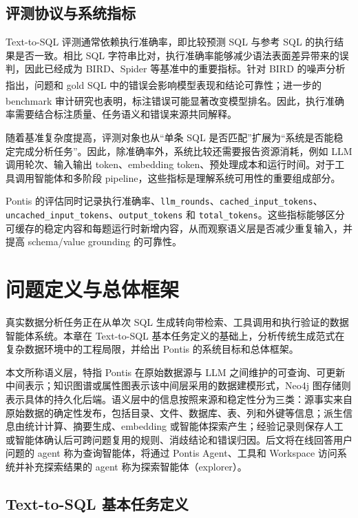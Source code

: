 \documentclass[
    bachelor,
    pdflinks,
]{xjtuthesis}
\newcommand{\upcite}[1]{\textsuperscript{\cite{#1}}}
\begin{document}
\section{评测协议与系统指标}

Text-to-SQL 评测通常依赖执行准确率，即比较预测 SQL 与参考 SQL 的执行结果是否一致。相比 SQL 字符串比对，执行准确率能够减少语法表面差异带来的误判，因此已经成为 BIRD、Spider 等基准中的重要指标。针对 BIRD 的噪声分析指出，问题和 gold SQL 中的错误会影响模型表现和结论可靠性\upcite{wretblad2024birdNoise}；进一步的 benchmark 审计研究也表明，标注错误可能显著改变模型排名\upcite{jin2026annotationErrors}。因此，执行准确率需要结合标注质量、任务语义和错误来源共同解释。

随着基准复杂度提高，评测对象也从“单条 SQL 是否匹配”扩展为“系统是否能稳定完成分析任务”。因此，除准确率外，系统比较还需要报告资源消耗，例如 LLM 调用轮次、输入输出 token、embedding token、预处理成本和运行时间。对于工具调用智能体和多阶段 pipeline，这些指标是理解系统可用性的重要组成部分。

Pontis 的评估同时记录执行准确率、\texttt{llm\_rounds}、\texttt{cached\_input\_tokens}、\texttt{uncached\_input\_tokens}、\texttt{output\_tokens} 和 \texttt{total\_tokens}。这些指标能够区分可缓存的稳定内容和每题运行时新增内容，从而观察语义层是否减少重复输入，并提高 schema/value grounding 的可靠性。


\chapter{问题定义与总体框架}

真实数据分析任务正在从单次 SQL 生成转向带检索、工具调用和执行验证的数据智能体系统。本章在 Text-to-SQL 基本任务定义的基础上，分析传统生成范式在复杂数据环境中的工程局限，并给出 Pontis 的系统目标和总体框架。

本文所称语义层，特指 Pontis 在原始数据源与 LLM 之间维护的可查询、可更新中间表示；知识图谱或属性图表示该中间层采用的数据建模形式，Neo4j 图存储则表示具体的持久化后端。语义层中的信息按照来源和稳定性分为三类：源事实来自原始数据的确定性发布，包括目录、文件、数据库、表、列和外键等信息；派生信息由统计计算、摘要生成、embedding 或智能体探索产生；经验记录则保存人工或智能体确认后可跨问题复用的规则、消歧结论和错误归因。后文将在线回答用户问题的 agent 称为查询智能体，将通过 Pontis Agent、工具和 Workspace 访问系统并补充探索结果的 agent 称为探索智能体（explorer）。

\section{Text-to-SQL 基本任务定义}
\end{document}
